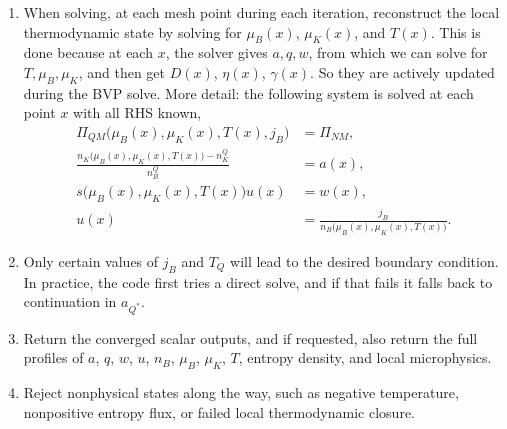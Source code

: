 \documentclass[11pt]{article}
\begin{document}
\begin{enumerate}
\begin{align}
\end{align}
\begin{itemize}
    \item There are in total 5 boundary conditions because the three coupled first-order ODE's need 3, and since $j_B, T_Q$ are also unknown global parameters, we need another 2, totaling 5.
    \item The last boundary condition is satisfied by an $e^{-\lambda x}$ asymptotic tail, so imposing that forces the solver to pick the right asymptotic behavior.
    \item Also, we apply the rescaling
    \[
    z = 1-e^{-\lambda x},
    \]
    which maps $(0,+\infty)$ to $(0,1)$, then we impose a cut-off $z\in(0,z_{\rm end})$ where
    \[
    z_{\rm end} = 1-\epsilon
    \]
    with default $\epsilon \sim 10^{-8}$.
\end{itemize}
\item When solving, at each mesh point during each iteration, reconstruct the local thermodynamic state by solving for $\mu_B(x)$, $\mu_K(x)$, and $T(x)$. This is done because at each $x$, the solver gives $a,q,w$, from which we can solve for $T, \mu_B, \mu_K$, and then get $D(x)$, $\eta(x)$, $\gamma(x)$. So they are actively updated during the BVP solve. More detail: the following system is solved at each point $x$ with all RHS known,
\begin{align}
\Pi_{QM}\Big(\mu_B(x), \mu_K(x), T(x), j_B\Big) & = \Pi_{NM}, \\
\frac{n_K\Big(\mu_B(x), \mu_K(x), T(x)\Big) - n_K^Q}{n_B^Q} & =  a(x), \\
s\Big(\mu_B(x), \mu_K(x), T(x)\Big)u(x) & = w(x), \\
u(x) & = \frac{j_B}{n_B\Big(\mu_B(x), \mu_K(x), T(x)\Big)}.
\end{align}
\item Only certain values of $j_B$ and $T_Q$ will lead to the desired boundary condition. In practice, the code first tries a direct solve, and if that fails it falls back to continuation in $a_{Q^\ast}$.
\item Return the converged scalar outputs, and if requested, also return the full profiles of $a$, $q$, $w$, $u$, $n_B$, $\mu_B$, $\mu_K$, $T$, entropy density, and local microphysics.
\item Reject nonphysical states along the way, such as negative temperature, nonpositive entropy flux, or failed local thermodynamic closure.
\end{enumerate}
\end{document}
